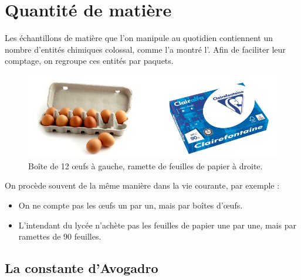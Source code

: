 \documentclass[french, a4paper, 12pt, landscape, twocolumn]{article}
\begin{document}
\vspace{.1cm}
\section{Quantité de matière}
\vspace{-.3cm}
Les échantillons de matière que l'on manipule au quotidien contiennent un
nombre d’entités chimiques colossal, comme l’a montré l'. Afin de faciliter leur comptage, on regroupe ces entités par paquets.

\begin{figure}[ht]
	\centering
	\includegraphics[width=.35\textwidth]{viecourante.png}	
	\caption{Boîte de 12 \oe ufs à gauche, ramette de feuilles de papier à droite.}
\end{figure}

On procède souvent de la même manière dans la vie courante, par exemple : 
\begin{itemize}
	\item On ne compte pas les \oe ufs un par un, mais par boîtes d'\oe ufs. 
	\item L'intendant du lycée n'achète pas les feuilles de papier une par une, mais par ramettes de 90 feuilles.
\end{itemize}

\subsection{La constante d'Avogadro}
\end{document}
